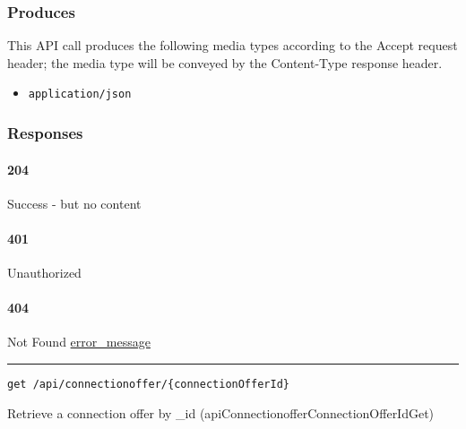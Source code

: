 \hypertarget{produces}{%
\subsubsection{Produces}\label{produces}}

This API call produces the following media types according to the
{Accept} request header; the media type will be conveyed by the
{Content-Type} response header.

\begin{itemize}
\tightlist
\item
  \texttt{application/json}
\end{itemize}

\hypertarget{responses}{%
\subsubsection{Responses}\label{responses}}

\hypertarget{section}{%
\paragraph{204}\label{section}}

Success - but no content \protect\hyperlink{}{}

\hypertarget{section-1}{%
\paragraph{401}\label{section-1}}

Unauthorized \protect\hyperlink{}{}

\hypertarget{section-2}{%
\paragraph{404}\label{section-2}}

Not Found \protect\hyperlink{error_message}{error\_message}

\begin{center}\rule{0.5\linewidth}{\linethickness}\end{center}

\protect\hypertarget{apiConnectionofferConnectionOfferIdGet}{}{}

\begin{verbatim}
get /api/connectionoffer/{connectionOfferId}
\end{verbatim}

Retrieve a connection offer by \_id
({apiConnectionofferConnectionOfferIdGet})

